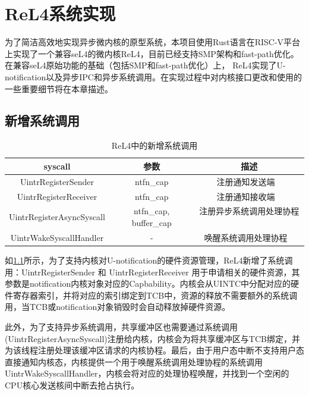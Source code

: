 \chapter{ReL4系统实现}
\label{chap:ReL4_impl}

为了简洁高效地实现异步微内核的原型系统，本项目使用Rust语言在RISC-V平台上实现了一个兼容seL4的微内核ReL4，目前已经支持SMP架构和fast-path优化。在兼容seL4原始功能的基础（包括SMP和fast-path优化）上， ReL4实现了U-notification以及异步IPC和异步系统调用。在实现过程中对内核接口更改和使用的一些重要细节将在本章描述。

\section{新增系统调用}

\begin{table}
    \centering
    \begin{tabular}{|c|c|c|}
        \hline 
        syscall & 参数 & 描述 \\
        \hline
        UintrRegisterSender & ntfn\_cap & 注册通知发送端 \ \\
        \hline
        UintrRegisterReceiver & ntfn\_cap & 注册通知接收端 \ \\
        \hline
        UintrRegisterAsyncSyscall & ntfn\_cap, buffer\_cap & 注册异步系统调用处理协程 \ \\
        \hline
        UintrWakeSyscallHandler & - & 唤醒系统调用处理协程 \ \\
        \hline
    \end{tabular}
    \caption{ReL4中的新增系统调用}
    \label{tab:new_syscall}
\end{table}

如\ref{tab:new_syscall}所示，为了支持内核对U-notification的硬件资源管理，ReL4新增了系统调用：UintrRegisterSender 和 UintrRegisterReceiver 用于申请相关的硬件资源，其参数是notification内核对象对应的Capbability。内核会从UINTC中分配对应的硬件寄存器索引，并将对应的索引绑定到TCB中，资源的释放不需要额外的系统调用，当TCB或notification对象销毁时会自动释放掉硬件资源。

此外，为了支持异步系统调用，共享缓冲区也需要通过系统调用(UintrRegisterAsyncSyscall)注册给内核，内核会为将共享缓冲区与TCB绑定，并为该线程注册处理该缓冲区请求的内核协程。最后，由于用户态中断不支持用户态直接通知内核态，内核提供一个用于唤醒系统调用处理协程的系统调用UintrWakeSyscallHandler，内核会将对应的处理协程唤醒，并找到一个空闲的CPU核心发送核间中断去抢占执行。

